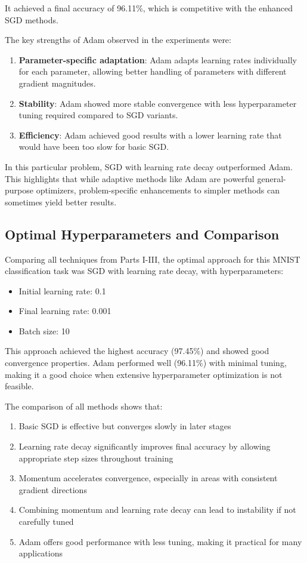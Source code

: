 \documentclass{article}
\begin{document}
It achieved a final accuracy of 96.11\%, which is competitive with the enhanced SGD methods.

The key strengths of Adam observed in the experiments were:
\begin{enumerate}
    \item \textbf{Parameter-specific adaptation}: Adam adapts learning rates individually for each parameter, allowing better handling of parameters with different gradient magnitudes.
    \item \textbf{Stability}: Adam showed more stable convergence with less hyperparameter tuning required compared to SGD variants.
    \item \textbf{Efficiency}: Adam achieved good results with a lower learning rate that would have been too slow for basic SGD.
\end{enumerate}

In this particular problem, SGD with learning rate decay outperformed Adam. This highlights that while adaptive methods like Adam are powerful general-purpose optimizers, problem-specific enhancements to simpler methods can sometimes yield better results.

\subsection{Optimal Hyperparameters and Comparison}

Comparing all techniques from Parts I-III, the optimal approach for this MNIST classification task was SGD with learning rate decay, with hyperparameters:
\begin{itemize}
    \item Initial learning rate: 0.1
    \item Final learning rate: 0.001
    \item Batch size: 10
\end{itemize}

This approach achieved the highest accuracy (97.45\%) and showed good convergence properties. Adam performed well (96.11\%) with minimal tuning, making it a good choice when extensive hyperparameter optimization is not feasible.

The comparison of all methods shows that:
\begin{enumerate}
    \item Basic SGD is effective but converges slowly in later stages
    \item Learning rate decay significantly improves final accuracy by allowing appropriate step sizes throughout training
    \item Momentum accelerates convergence, especially in areas with consistent gradient directions
    \item Combining momentum and learning rate decay can lead to instability if not carefully tuned
    \item Adam offers good performance with less tuning, making it practical for many applications
\end{enumerate}
\end{document}
